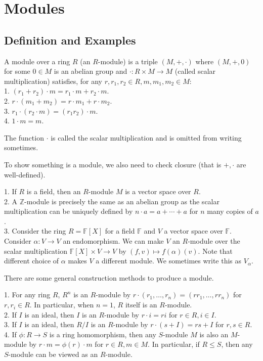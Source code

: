 \section{Modules}
\subsection{Definition and Examples}
\begin{definition}
    A module over a ring $R$ (an $R$-module) is a triple $(M,+,\cdot)$ where $(M,+,0)$ for some $0\in M$ is an abelian group and $\cdot:R\times M\to M$ (called scalar multiplication) satisfies, for any $r,r_1,r_2\in R,m,m_1,m_2\in M$:\\
    1. $(r_1+r_2)\cdot m=r_1\cdot m+r_2\cdot m$.\\
    2. $r\cdot (m_1+m_2)=r\cdot m_1+r\cdot m_2$.\\
    3. $r_1\cdot(r_2\cdot m)=(r_1r_2)\cdot m$.\\
    4. $1\cdot m=m$.
\end{definition}
The function $\cdot$ is called the scalar multiplication and is omitted from writing sometimes.
\begin{remark}
    To show something is a module, we also need to check closure (that is $+,\cdot$ are well-defined).
\end{remark}
\begin{example}
    1. If $R$ is a field, then an $R$-module $M$ is a vector space over $R$.\\
    2. A $\mathbb Z$-module is precisely the same as an abelian group as the scalar multiplication can be uniquely defined by $n\cdot a=a+\cdots +a$ for $n$ many copies of $a$.\\
    3. Consider the ring $R=\mathbb F[X]$ for a field $\mathbb F$ and $V$ a vector space over $\mathbb F$.
    Consider $\alpha:V\to V$ an endomorphism.
    We can make $V$ an $R$-module over the scalar multiplication $\mathbb F[X]\times V\to V$ by $(f,v)\mapsto f(\alpha)(v)$.
    Note that different choice of $\alpha$ makes $V$ a different module.
    We sometimes write this as $V_\alpha$.
\end{example}
There are some general construction methods to produce a module.
\begin{example}
    1. For any ring $R$, $R^n$ is an $R$-module by $r\cdot(r_1,\ldots,r_n)=(rr_1,\ldots,rr_n)$ for $r,r_i\in R$.
    In particular, when $n=1$, $R$ itself is an $R$-module.\\
    2. If $I$ is an ideal, then $I$ is an $R$-module by $r\cdot i=ri$ for $r\in R,i\in I$.\\
    3. If $I$ is an ideal, then $R/I$ is an $R$-module by $r\cdot(s+I)=rs+I$ for $r,s\in R$.\\
    4. If $\phi:R\to S$ is a ring homomorphism, then any $S$-module $M$ is also an $M$-module by $r\cdot m=\phi(r)\cdot m$ for $r\in R,m\in M$.
    In particular, if $R\le S$, then any $S$-module can be viewed as an $R$-module.
\end{example}
